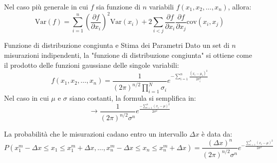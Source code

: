 \documentclass[openany,a4paper,12pt]{book}
\theoremstyle{remark}
\begin{document}
Nel caso più generale in cui $f$ sia funzione di $n$ variabili $f(x_1, x_2, \dots, x_n)$, allora:
\begin{equation}
\text{Var}(f) = \sum_{i=1}^n \left( \frac{\partial f}{\partial x_i} \right)^2 \text{Var}(x_i) + 2 \sum_{i < j} \frac{\partial f}{\partial x_i} \frac{\partial f}{\partial x_j} \text{cov}(x_i, x_j)
\end{equation}



\begin{bressan}{Funzione di distribuzione congiunta e Stima dei Parametri}
Dato un set di $n$ misurazioni indipendenti, la "funzione di distribuzione congiunta" si ottiene come il prodotto delle funzioni gaussiane delle singole variabili:
\begin{equation*}
    f(x_1, x_2, \ldots, x_n) = \frac{1}{(2\pi)^{n/2} \prod_{i=1}^{N}\sigma_i} e^{-\sum_{i=1}^n \frac{(x_i - \mu_i)^2}{2\sigma_i^2}} 
\end{equation*}
Nel caso in cui $\mu$ e $\sigma$ siano costanti, la formula si semplifica in:
\begin{equation*}
    \rightarrow \frac{1}{(2\pi)^{n/2} \sigma^n} e^{\frac{-\sum_{i=1}^n (x_i - \mu)^2}{2\sigma^{2}}}
\end{equation*}

La probabilità che le misurazioni cadano entro un intervallo $\Delta x$ è data da:
\begin{equation*}
    P(x_1^m - \Delta x \leq x_1 \leq x_1^m + \Delta x, \ldots, x_n^m - \Delta x \leq x_n \leq x_n^m + \Delta x) = \frac{(\Delta x)^n}{(2\pi)^{n/2} \sigma^n} e^{-\frac{\sum_{i=1}^n (x_i - \mu)^2}{2\sigma^2}}
\end{equation*}
\end{bressan}
\end{document}
